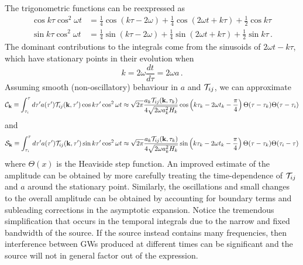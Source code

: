 \documentclass{revtex4}
\begin{document}
The trigonometric functions can be reexpressed as
\begin{subequations}
\begin{align}
  \cos k\tau\cos^2\omega t &= \frac{1}{4}\cos(k\tau-2\omega) + \frac{1}{4}\cos(2\omega t+k\tau) + \frac{1}{2}\cos k\tau \\
  \sin k\tau\cos^2\omega t &= \frac{1}{4}\sin(k\tau-2\omega) + \frac{1}{4}\sin(2\omega t+k\tau) + \frac{1}{2}\sin k\tau \, .
\end{align}
\end{subequations}
The dominant contributions to the integrals come from the sinusoids of $2\omega t - k\tau$, which have stationary points in their evolution when
\begin{equation}
  k = 2\omega\frac{dt}{d\tau} = 2\omega a \, .
\end{equation}
Assuming smooth (non-oscillatory) behaviour in $a$ and $\mathcal{T}_{ij}$, we can approximate
\begin{equation}
  \label{eqn:cosine-int}
  \mathcal{C}_{{\bf k}} \equiv \int_{\tau_i}^\tau d\tau' a(\tau')\mathcal{T}_{ij}({\bf k},\tau')\cos k\tau'\cos^2\omega t \approx \sqrt{2\pi}\frac{a_k\mathcal{T}_{ij}({\bf k},\tau_k)}{4\sqrt{2\omega a^2_kH_k}}\cos\left(k\tau_k - 2\omega t_k -\frac{\pi}{4}\right)\Theta(\tau - \tau_k)\Theta(\tau-\tau_i)
\end{equation}
and
\begin{equation}
  \label{eqn:sine-int}
  \mathcal{S}_{{\bf k}} \equiv \int_{\tau_i}^\tau d\tau' a(\tau')\mathcal{T}_{ij}({{\bf k}},\tau')\sin k\tau'\cos^2\omega t \approx \sqrt{2\pi}\frac{a_k\mathcal{T}_{ij}({\bf k},\tau_k)}{4\sqrt{2\omega a^2_kH_k}}\sin\left(k\tau_k - 2\omega t_k -\frac{\pi}{4}\right)\Theta(\tau - \tau_k)\Theta(\tau_i-\tau)
\end{equation}
where $\Theta(x)$ is the Heaviside step function.
An improved estimate of the amplitude can be obtained by more carefully treating the time-dependence of $\mathcal{T}_{ij}$ and $a$ around the stationary point.
Similarly, the oscillations and small changes to the overall amplitude can be obtained by accounting for boundary terms and subleading corrections in the asymptotic expansion.
Notice the tremendous simplification that occurs in the temporal integrals due to the narrow and fixed bandwidth of the source.
If the source instead contains many frequencies, then interference between GWs produced at different times can be significant and the source will not in general factor out of the expression.
\end{document}
